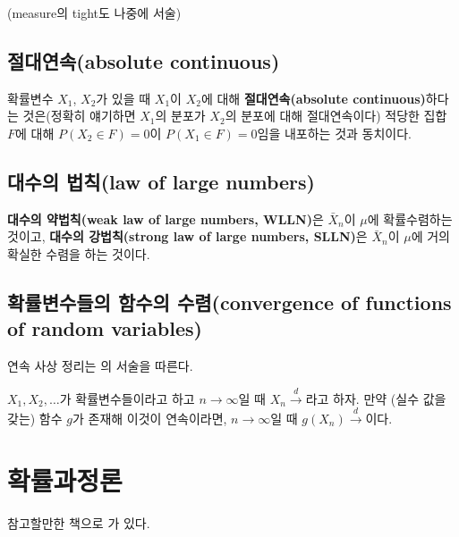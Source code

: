\documentclass[b5paper,]{scrbook}
\theoremstyle{plain}
\theoremstyle{definition}
\numberwithin{equation}{section}
\let\BeginKnitrBlock\begin \let\EndKnitrBlock\end
\begin{document}
(measure의 tight도 나중에 서술)

\section{절대연속(absolute continuous)}\label{absolute-continuous}

확률변수 \(X_{1}\), \(X_{2}\)가 있을 때 \(X_{1}\)이 \(X_{2}\)에 대해
\textbf{절대연속(absolute continuous)}하다는 것은(정확히 얘기하면
\(X_{1}\)의 분포가 \(X_{2}\)의 분포에 대해 절대연속이다) 적당한 집합
\(F\)에 대해 \(P(X_{2}\in F)=0\)이 \(P(X_{1}\in F)=0\)임을 내포하는 것과
동치이다.

\section{대수의 법칙(law of large numbers)}\label{-law-of-large-numbers}

\BeginKnitrBlock{proposition}[대수의 약법칙과 대수의 강법칙]
\protect\hypertarget{prp:unnamed-chunk-88}{}{\label{prp:unnamed-chunk-88}
{} }\textbf{대수의
약법칙(weak law of large numbers, WLLN)}은 \(\bar{X}_{n}\)이 \(\mu\)에
확률수렴하는 것이고, \textbf{대수의 강법칙(strong law of large numbers,
SLLN)}은 \(\bar{X}_{n}\)이 \(\mu\)에 거의 확실한 수렴을 하는 것이다.
\EndKnitrBlock{proposition}

\section{확률변수들의 함수의 수렴(convergence of functions of random
variables)}\label{--convergence-of-functions-of-random-variables}

연속 사상 정리는 \citep{Gut2012}의 서술을 따른다.

\BeginKnitrBlock{theorem}[연속 사상 정리]
\protect\hypertarget{thm:contmappingthm}{}{\label{thm:contmappingthm}
{} }\(X_{1}, X_{2},\ldots\)가
확률변수들이라고 하고 \(n\rightarrow \infty\)일 때
\(X_{n}\stackrel{d}{\rightarrow}\)라고 하자. 만약 (실수 값을 갖는) 함수
\(g\)가 존재해 이것이 연속이라면, \(n\rightarrow \infty\)일 때
\(g(X_{n})\stackrel{d}{\rightarrow}\)이다.
\EndKnitrBlock{theorem}

\chapter{확률과정론}\label{stoprocess}

참고할만한 책으로 \citep{Lindgren2012}가 있다.
\end{document}

